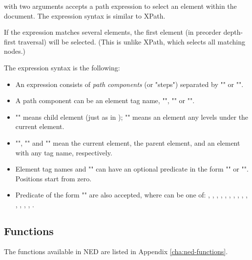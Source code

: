  with two arguments accepts a path expression
to select an element within the document. The expression syntax is
similar to XPath.

If the expression matches several elements, the first element
(in preorder depth-first traversal) will be selected. (This is
unlike XPath, which selects all matching nodes.)

The expression syntax is the following:
\begin{itemize}
  \item An expression consists of \textit{path components} (or "steps")
        separated by "\ttt{/}" or "\ttt{//}".
  \item A path component can be an element tag name, "\ttt{*}", ""
        or "".
  \item "\ttt{/}" means child element (just as in );
        "\ttt{//}" means an element any levels under the current element.
  \item "", "" and "\ttt{*}" mean the current element,
        the parent element, and an element with any tag name, respectively.
  \item Element tag names and "\ttt{*}" can have an optional predicate
        in the form "\ttt{[position]}" or "\ttt{[@attribute='value']}".
        Positions start from zero.
  \item Predicate of the form "\ttt{[@attribute=\textit{\$param}]}" are also
        accepted, where  can be one of:
        ,
        ,
        ,
        ,
        ,
        ,
        ,
        ,
        ,
        ,
        ,
        ,
        ,
        ,
        .
\end{itemize}

\subsection{Functions}

The functions available in NED are listed in Appendix
\ref{cha:ned-functions}.

